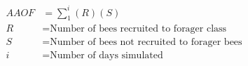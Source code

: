 \documentclass[fleqn, oneside, 11pt]{article}
\begin{document}
\begin{preview}
\begin{align*}
AAOF & = \sum_{1}^{i}\left(R\right)\left(S\right)\nonumber \\
R & =  \text{Number of bees recruited to forager class} \nonumber \\
S & =  \text{Number of bees not recruited to forager bees} \nonumber \\
i & =  \text{Number of days simulated} \nonumber \\
\end{align*} 
\end{preview}
\end{document}
